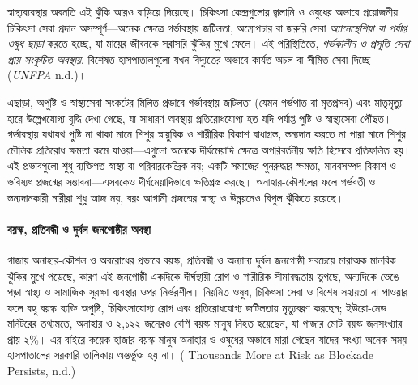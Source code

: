স্বাস্থ্যব্যবস্থার অবনতি এই ঝুঁকি আরও বাড়িয়ে দিয়েছে। চিকিৎসা কেন্দ্রগুলোর জ্বালানি
ও ওষুধের অভাবে প্রয়োজনীয় চিকিৎসা সেবা প্রদান অসম্পূর্ণ---অনেক ক্ষেত্রে গর্ভাবস্থায়
জটিলতা, অস্ত্রোপচার বা জরুরি সেবা \emph{অ্যানেস্থেশিয়া বা পর্যাপ্ত ওষুধ ছাড়া}
করতে হচ্ছে, যা মায়ের জীবনকে সরাসরি ঝুঁকির মুখে ফেলে। এই পরিস্থিতিতে,
\emph{গর্ভকালীন ও প্রসূতি সেবা প্রায় সংকুচিত অবস্থায়}, বিশেষত হাসপাতালগুলো যখন
বিদ্যুতের অভাবে কার্যত অচল বা সীমিত সেবা দিচ্ছে (\emph{UNFPA} n.d.)।

এছাড়া, অপুষ্টি ও স্বাস্থ্যসেবা সংকটের মিলিত প্রভাবে গর্ভাবস্থায় জটিলতা (যেমন
গর্ভপাত বা মৃতপ্রসব) এবং মাতৃমৃত্যু হারে উল্লেখযোগ্য বৃদ্ধি দেখা গেছে, যা সাধারণ
অবস্থায় প্রতিরোধযোগ্য হত যদি পর্যাপ্ত পুষ্টি ও স্বাস্থ্যসেবা পৌঁছত। গর্ভাবস্থায় যথাযথ
পুষ্টি না থাকা মানে শিশুর স্নায়ুবিক ও শারীরিক বিকাশ বাধাগ্রস্ত, স্তন্যদান করতে না
পারা মানে শিশুর মৌলিক প্রতিরোধ ক্ষমতা কমে যাওয়া---এগুলো অনেকে দীর্ঘমেয়াদি
ক্ষেত্রে অপরিবর্তনীয় ক্ষতি হিসেবে প্রতিফলিত হয়। এই প্রভাবগুলো শুধু ব্যক্তিগত স্বাস্থ্য
বা পরিবারকেন্দ্রিক নয়; একটি সমাজের পুনরুদ্ধার ক্ষমতা, মানবসম্পদ বিকাশ ও ভবিষ্যৎ
প্রজন্মের সম্ভাবনা---এসবকেও দীর্ঘমেয়াদিভাবে ক্ষতিগ্রস্ত করছে। অনাহার-কৌশলের ফলে
গর্ভবতী ও স্তন্যদানকারী নারীরা শুধু আজ নয়, বরং আগামী প্রজন্মের স্বাস্থ্য ও উন্নয়নেও
বিপুল ঝুঁকিতে রয়েছে।

\paragraph{বয়স্ক, প্রতিবন্ধী ও দুর্বল জনগোষ্ঠীর
অবস্থা}\label{ux9acux9dfux9b8ux995-ux9aaux9b0ux9a4ux9acux9a8ux9a7-ux993-ux9a6ux9b0ux9acux9b2-ux99cux9a8ux997ux9b7ux9a0ux9b0-ux985ux9acux9b8ux9a5}

গাজায় অনাহার-কৌশল ও অবরোধের প্রভাবে বয়স্ক, প্রতিবন্ধী ও অন্যান্য দুর্বল জনগোষ্ঠী
সবচেয়ে মারাত্মক মানবিক ঝুঁকির মুখে পড়েছে, কারণ এই জনগোষ্ঠী একদিকে দীর্ঘস্থায়ী
রোগ ও শারীরিক সীমাবদ্ধতায় ভুগছে, অন্যদিকে ভেঙে পড়া স্বাস্থ্য ও সামাজিক সুরক্ষা
ব্যবস্থার ওপর নির্ভরশীল। নিয়মিত ওষুধ, চিকিৎসা সেবা ও বিশেষ সহায়তা না পাওয়ার
ফলে বহু বয়স্ক ব্যক্তি অপুষ্টি, চিকিৎসাযোগ্য রোগ এবং প্রতিরোধযোগ্য জটিলতায় মৃত্যুবরণ
করছেন; ইউরো-মেড মনিটরের তথ্যমতে, অনাহার ও ২,১২২ জনেরও বেশি বয়স্ক মানুষ নিহত
হয়েছেন, যা গাজার মোট বয়স্ক জনসংখ্যার প্রায় ২\%। এর বাইরে কয়েক হাজার বয়স্ক
মানুষ অনাহার ও ওষুধের অভাবে মারা গেছেন যাদের সংখ্যা অনেক সময় হাসপাতালের
সরকারি তালিকায় অন্তর্ভুক্ত হয় না। ( Thousands More at Risk as Blockade
Persists, n.d.)।

